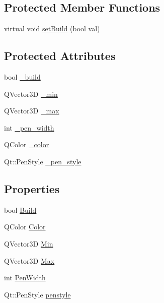 \subsection*{Protected Member Functions}
\begin{DoxyCompactItemize}
\item 
virtual void \hyperlink{classShipCAD_1_1Entity_a1889198398f42bb7f77a2334031c3f33}{set\-Build} (bool val)
\end{DoxyCompactItemize}
\subsection*{Protected Attributes}
\begin{DoxyCompactItemize}
\item 
bool \hyperlink{classShipCAD_1_1Entity_a752e3eb309111a7457783e0fdab3d6fe}{\-\_\-build}
\item 
Q\-Vector3\-D \hyperlink{classShipCAD_1_1Entity_a414d4ff1ee308d47a5052910c3b34f7b}{\-\_\-min}
\item 
Q\-Vector3\-D \hyperlink{classShipCAD_1_1Entity_a30e4f9cb421987cebd07737a554275eb}{\-\_\-max}
\item 
int \hyperlink{classShipCAD_1_1Entity_a5a9892a0d84d2cfdcd3a5dabf662a595}{\-\_\-pen\-\_\-width}
\item 
Q\-Color \hyperlink{classShipCAD_1_1Entity_a150a19aa958886e9dcf7c4e0e51dcd98}{\-\_\-color}
\item 
Qt\-::\-Pen\-Style \hyperlink{classShipCAD_1_1Entity_ac53123be976cd9739ad1657573d67d97}{\-\_\-pen\-\_\-style}
\end{DoxyCompactItemize}
\subsection*{Properties}
\begin{DoxyCompactItemize}
\item 
bool \hyperlink{classShipCAD_1_1Entity_a7518cde7c6a7c576827efd3d65c732e4}{Build}
\item 
Q\-Color \hyperlink{classShipCAD_1_1Entity_a117b8362d17e9ef352555a85a6f015ff}{Color}
\item 
Q\-Vector3\-D \hyperlink{classShipCAD_1_1Entity_ac363c3a8e4d5553b98996d6114b6b148}{Min}
\item 
Q\-Vector3\-D \hyperlink{classShipCAD_1_1Entity_a1ce317d1da352757209465baebce15f8}{Max}
\item 
int \hyperlink{classShipCAD_1_1Entity_a95a1cc38c08e5b64a540727afb99d25a}{Pen\-Width}
\item 
Qt\-::\-Pen\-Style \hyperlink{classShipCAD_1_1Entity_a8cbcbada188edd9d39e7c5743dc43560}{penstyle}
\end{DoxyCompactItemize}


